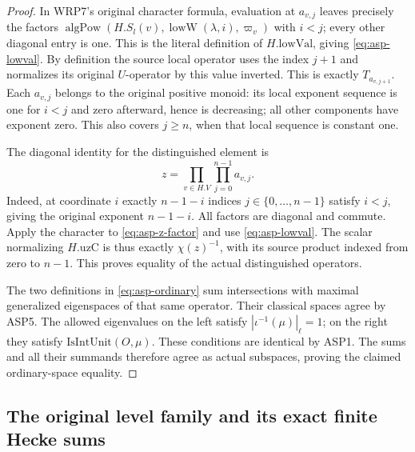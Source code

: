 \documentclass[11pt,a4paper]{article}
\numberwithin{equation}{section}
\theoremstyle{remark}\newtheorem{remark}[theorem]{Remark}
\begin{document}
\begin{proof}
In WRP7's original character formula, evaluation
at $a_{v,\allowbreak{} j}$ leaves precisely the factors
$\operatorname{algPow}(H.S_l(v),
\operatorname{lowW}(\lambda,\allowbreak{} i),\varpi_v)$
with $i<j$; every other diagonal entry is one.
This is the literal definition of $H.\mathrm{lowVal}$,
giving \eqref{eq:asp-lowval}.  By definition the
source local operator uses the index $j+1$ and
normalizes its original $U$-operator by this value
inverted.  This is exactly $T_{a_{v,\allowbreak{} j+1}}$.
Each $a_{v,\allowbreak{} j}$ belongs to the original positive
monoid: its local exponent sequence is one for
$i<j$ and zero afterward, hence is decreasing;
all other components have exponent zero.  This
also covers $j\geq n$, when that local sequence
is constant one.

The diagonal identity for the distinguished element is
\begin{equation}\label{eq:asp-z-factor}
                    z=\prod_{v\in H.V}\prod_{j=0}^{n-1}a_{v,\allowbreak{} j}.
\end{equation}
Indeed, at coordinate $i$ exactly $n-1-i$ indices
$j\in\{0,\ldots,\allowbreak{} n-1\}$ satisfy $i<j$, giving
the original exponent $n-1-i$.  All factors are
diagonal and commute.  Apply the character to
\eqref{eq:asp-z-factor} and use
\eqref{eq:asp-lowval}.  The scalar normalizing
$H.\mathrm{uzC}$ is thus exactly $\chi(z)^{-1}$,
with its source product indexed from zero to
$n-1$.  This proves equality of the actual
distinguished operators.

The two definitions in \eqref{eq:asp-ordinary}
sum intersections with maximal generalized
eigenspaces of that same operator.  Their
classical spaces agree by ASP5.  The allowed
eigenvalues on the left satisfy
$|\iota^{-1}(\mu)|_\ell=1$; on the right they
satisfy $\mathrm{IsIntUnit}(O,\mu)$.
These conditions are identical by ASP1.
The sums and all their summands therefore
agree as actual subspaces, proving the claimed
ordinary-space equality.
\end{proof}

\subsection{The original level family and its exact finite Hecke sums}

\end{document}
